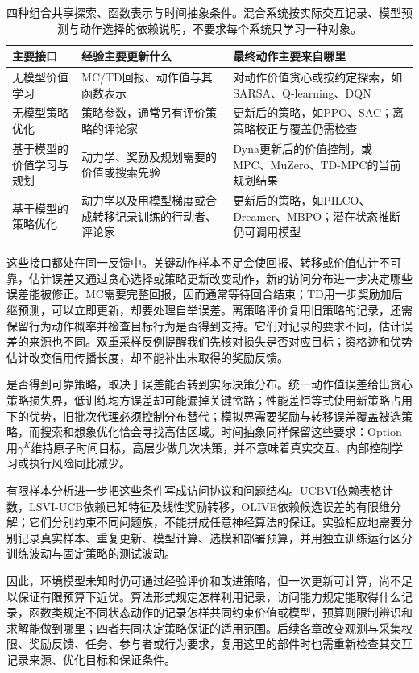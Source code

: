 \begin{table}[t]
  \centering
  \small
  \begin{tabularx}{\linewidth}{>{\raggedright\arraybackslash}p{28mm} >{\raggedright\arraybackslash}X >{\raggedright\arraybackslash}X}
    \toprule
    主要接口 & 经验主要更新什么 & 最终动作主要来自哪里 \\
    \midrule
    无模型价值学习 & MC/TD回报、动作值与其函数表示 & 对动作价值贪心或按约定探索，如SARSA、Q-learning、DQN \\
    无模型策略优化 & 策略参数，通常另有评价策略的评论家 & 更新后的策略，如PPO、SAC；离策略校正与覆盖仍需检查 \\
    基于模型的价值学习与规划 & 动力学、奖励及规划需要的价值或搜索先验 & Dyna更新后的价值控制，或MPC、MuZero、TD-MPC的当前规划结果 \\
    基于模型的策略优化 & 动力学以及用模型梯度或合成转移记录训练的行动者、评论家 & 更新后的策略，如PILCO、Dreamer、MBPO；潜在状态推断仍可调用模型 \\
    \bottomrule
  \end{tabularx}
  \caption{四种组合共享探索、函数表示与时间抽象条件。混合系统按实际交互记录、模型预测与动作选择的依赖说明，不要求每个系统只学习一种对象。}
  \label{tab:rl-learning-final-interfaces}
\end{table}

这些接口都处在同一反馈中。关键动作样本不足会使回报、转移或价值估计不可靠，估计误差又通过贪心选择或策略更新改变动作，新的访问分布进一步决定哪些误差能被修正。MC需要完整回报，因而通常等待回合结束；TD用一步奖励加后继预测，可以立即更新，却要处理自举误差。离策略评价复用旧策略的记录，还需保留行为动作概率并检查目标行为是否得到支持。它们对记录的要求不同，估计误差的来源也不同。双重采样反例提醒我们先核对损失是否对应目标；资格迹和优势估计改变信用传播长度，却不能补出未取得的奖励反馈。

是否得到可靠策略，取决于误差能否转到实际决策分布。统一动作值误差给出贪心策略损失界，低训练均方误差却可能漏掉关键岔路；性能差恒等式使用新策略占用下的优势，旧批次代理必须控制分布替代；模拟界需要奖励与转移误差覆盖被选策略，而搜索和想象优化恰会寻找高估区域。时间抽象同样保留这些要求：Option用$\gamma^K$维持原子时间目标，高层少做几次决策，并不意味着真实交互、内部控制学习或执行风险同比减少。

有限样本分析进一步把这些条件写成访问协议和问题结构。UCBVI依赖表格计数，LSVI-UCB依赖已知特征及线性奖励转移，OLIVE依赖候选误差的有限维分解；它们分别约束不同问题族，不能拼成任意神经算法的保证。实验相应地需要分别记录真实样本、重复更新、模型计算、选模和部署预算，并用独立训练运行区分训练波动与固定策略的测试波动。

因此，环境模型未知时仍可通过经验评价和改进策略，但一次更新可计算，尚不足以保证有限预算下近优。算法形式规定怎样利用记录，访问能力规定能取得什么记录，函数类规定不同状态动作的记录怎样共同约束价值或模型，预算则限制辨识和求解能做到哪里；四者共同决定策略保证的适用范围。后续各章改变观测与采集权限、奖励反馈、任务、参与者或行为要求，复用这里的部件时也需重新检查其交互记录来源、优化目标和保证条件。
